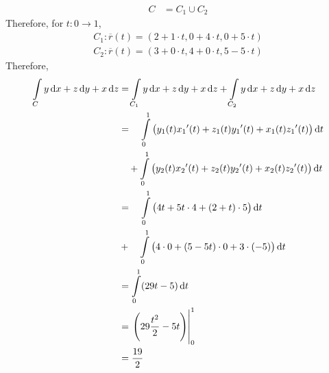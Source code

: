 \documentclass[fleqn, a4paper, 8pt, twoside]{amsart}
\theoremstyle{definition}
\theoremstyle{bluedefinition}
\theoremstyle{redtheorem}
\begin{document}
\begin{multicols}{2}
\begin{spacing}{0.7}
\begin{question}
\begin{figure}[H]
	\end{figure}
\end{question}

\begin{solution}
	\begin{align*}
		C &= C_1 \cup C_2
	\end{align*}
	Therefore, for $t : 0 \to 1$,
	\begin{gather*}
		C_1 : \overline{r}(t) = (2 + 1 \cdot t , 0 + 4 \cdot t , 0 + 5 \cdot t) \\
		C_2 : \overline{r}(t) = (3 + 0 \cdot t , 4 + 0 \cdot t , 5 - 5 \cdot t)
	\end{gather*}
	Therefore,
	\begin{align*}
		\int\limits_{C} y \dif x + z \dif y + x \dif z & = \int\limits_{C_1} y \dif x + z \dif y + x \dif z + \int\limits_{C_2} y \dif x + z \dif y + x \dif z    \\
                                                               & = \quad \int\limits_{0}^{1} \left( y_1(t) {x_1}'(t) + z_1(t) {y_1}'(t) + x_1(t) {z_1}'(t) \right) \dif t \\
                                                               & \quad + \int\limits_{0}^{1} \left( y_2(t) {x_2}'(t) + z_2(t) {y_2}'(t) + x_2(t) {z_2}'(t) \right) \dif t \\
                                                               & = \quad \int\limits_{0}^{1} \left( 4 t + 5 t \cdot 4 + (2 + t) \cdot 5 \right) \dif t                    \\
                                                               & + \quad \int\limits_{0}^{1} \left( 4 \cdot 0 + (5 - 5 t) \cdot 0 + 3 \cdot (-5) \right) \dif t           \\
                                                               & = \int\limits_{0}^{1} (29 t - 5) \dif t                                                                  \\
                                                               & = \left. \left( 29 \frac{t^2}{2} - 5 t \right) \right|_{0}^{1}                                           \\
                                                               & = \frac{19}{2}
	\end{align*}
\end{solution}


\end{spacing}
\end{multicols}
\end{document}
